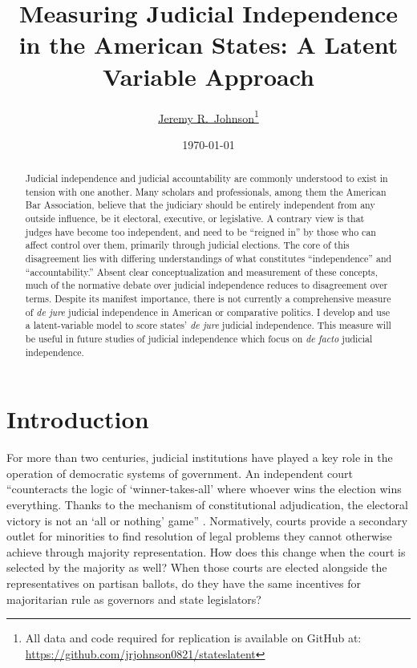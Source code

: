 \documentclass[12pt]{article}
\title{Measuring Judicial Independence in the American States: A Latent Variable Approach}
\author{\href{mailto:Jeremy.Johnson@psu.edu}{Jeremy R.\ Johnson}\thanks{All data and code required for replication is available on GitHub at: \url{https://github.com/jrjohnson0821/stateslatent}}}
\affil{Pennsylvania State University}
\date{\today}
\begin{document}
\maketitle
\thispagestyle{empty}
	
\begin{abstract}
Judicial independence and judicial accountability are commonly understood to exist in tension with one another. Many scholars and professionals, among them the American Bar Association, believe that the judiciary should be entirely independent from any outside influence, be it electoral, executive, or legislative. A contrary view is that judges have become too independent, and need to be “reigned in” by those who can affect control over them, primarily through judicial elections. The core of this disagreement lies with differing understandings of what constitutes “independence” and “accountability.” Absent clear conceptualization and measurement of these concepts, much of the normative debate over judicial independence reduces to disagreement over terms. Despite its manifest importance, there is not currently a comprehensive measure of \textit{de jure} judicial independence in American or comparative politics. I develop and use a latent-variable model to score states' \textit{de jure} judicial independence. This measure will be useful in future studies of judicial independence which focus on \textit{de facto} judicial independence.
\end{abstract}
	
	
\pagebreak\doublespacing
\setcounter{page}{1}

\section*{Introduction}\label{Intro}
For more than two centuries, judicial institutions have played a key role in the operation of democratic systems of government.  An independent court ``counteracts the logic of `winner-takes-all' where whoever wins the election wins everything. Thanks to the mechanism of constitutional adjudication, the electoral victory is not an `all or nothing' game'' \citep[1685]{Ferejohn2003}. Normatively, courts provide a secondary outlet for minorities to find resolution of legal problems they cannot otherwise achieve through majority representation.  How does this change when the court is selected by the majority as well?  When those courts are elected alongside the representatives on partisan ballots, do they have the same incentives for majoritarian rule as governors and state legislators?
\end{document}
